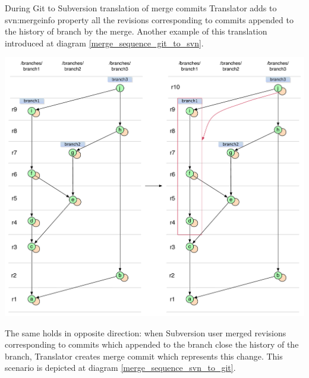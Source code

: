 During Git to Subversion translation of merge commits Translator adds to svn:mergeinfo property all the revisions corresponding to commits appended to the history of branch by the merge. Another example of this translation introduced at diagram \ref{merge_sequence_git_to_svn}.

\begin{center}
\includegraphics[width=\textwidth]{img/diagrams/merge_sequence_git_to_svn.pdf}%
\label{merge_sequence_git_to_svn}%
\end{center}

The same holds in opposite direction: when Subversion user merged revisions corresponding to commits which appended to the branch close the history of the branch, Translator creates merge commit which represents this change. This scenario is depicted at diagram \ref{merge_sequence_svn_to_git}.

